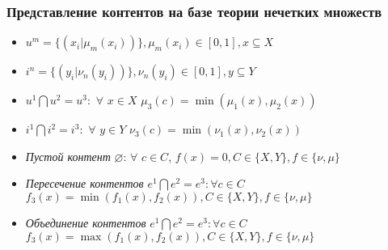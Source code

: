 \documentclass[10pt,xcolor={usenames,dvipsnames}]{beamer}
\theoremstyle{break}
\def\top{\text{top-N}}
\begin{document}


\begin{frame}
  \frametitle{Представление контентов на базе теории нечетких множеств}
  \begin{itemize}
  \item $u^m = \{(x_i | \mu_m(x_i )) \}, \mu_m(x_i) \in [0,1], x \subseteq X$
  \item $i^n = \{(y_i | \nu_n(y_i )) \}, \nu_n(y_i) \in [0,1], y \subseteq Y$
  \item $u^1 \bigcap u^2 = u^3:$ $\forall$ $x \in X$ $\mu_3(c) = \min(\mu_1(x), \mu_2(x))$
  \item $i^1 \bigcap i^2 = i^3:$ $\forall$ $y \in Y$ $\nu_3(c) = \min(\nu_1(x), \nu_2(x))$
  \item {\it Пустой контент} $\varnothing$:  $\forall$ $c \in C$, $f(x) = 0, C \in \{X, Y\}, f \in \{\nu, \mu\}$
  \item {\it Пересечение контентов} $e^1 \bigcap e^2 = e^3: \forall c \in C$ $f_3(x) = \min(f_1(x), f_2(x)), C \in \{X, Y\}, f \in \{\nu, \mu\}$
  \item {\it Объединение контентов} $e^1 \bigcap e^2 = e^3: \forall c \in C$ $f_3(x) = \max(f_1(x), f_2(x)), C \in \{X, Y\}, f \in \{\nu, \mu\}$
  \end{itemize}
\end{frame}
\end{document}
